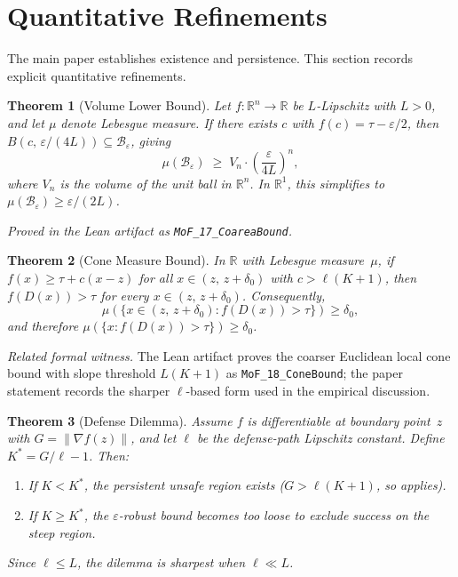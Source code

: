 \documentclass[11pt]{article}
\newtheorem{theorem}{Theorem}[section]
\newcommand{\R}{\mathbb{R}}
\begin{document}
\section{Quantitative Refinements}
\label{app:quantitative}

The main paper establishes existence and persistence. This section
records explicit quantitative refinements.

\begin{theorem}[Volume Lower Bound]
\label{thm:coarea}
Let $f\colon \R^n \to \R$ be $L$-Lipschitz with $L > 0$, and let
$\mu$ denote Lebesgue measure. If there exists $c$ with
$f(c) = \tau - \varepsilon/2$, then
$B(c,\, \varepsilon/(4L)) \subseteq
\mathcal{B}_\varepsilon$, giving
\[
  \mu(\mathcal{B}_\varepsilon)
  \;\geq\; V_n \cdot \left(\frac{\varepsilon}{4L}\right)^{\!n},
\]
where $V_n$ is the volume of the unit ball in $\R^n$. In $\R^1$,
this simplifies to $\mu(\mathcal{B}_\varepsilon) \geq \varepsilon/(2L)$.
\end{theorem}

\noindent\emph{Proved in the Lean artifact as
\textup{\texttt{MoF\_17\_CoareaBound}}.}

\begin{theorem}[Cone Measure Bound]
\label{thm:cone}
In $\R$ with Lebesgue measure~$\mu$, if
$f(x) \geq \tau + c(x - z)$ for all $x \in (z,\, z + \delta_0)$
with $c > \ell(K+1)$, then
$f(D(x)) > \tau$ for every $x \in (z,\, z + \delta_0)$. Consequently,
\[
  \mu(\{x \in (z,\, z+\delta_0) : f(D(x)) > \tau\}) \geq \delta_0,
\]
and therefore $\mu(\{x : f(D(x)) > \tau\}) \geq \delta_0$.
\end{theorem}

\noindent\emph{Related formal witness.} The Lean artifact proves the
coarser Euclidean local cone bound with slope threshold $L(K{+}1)$ as
\textup{\texttt{MoF\_18\_ConeBound}}; the paper statement records the
sharper $\ell$-based form used in the empirical discussion.

\begin{theorem}[Defense Dilemma]
\label{thm:dilemma}
Assume $f$ is differentiable at boundary point~$z$ with
$G = \|\nabla f(z)\|$, and let $\ell$ be the defense-path Lipschitz
constant. Define $K^* = G/\ell - 1$. Then:
\begin{enumerate}[nosep]
  \item If $K < K^*$, the persistent unsafe region exists
    ($G > \ell(K+1)$, so  applies).
  \item If $K \geq K^*$, the $\varepsilon$-robust bound becomes too
    loose to exclude success on the steep region.
\end{enumerate}
Since $\ell \leq L$, the dilemma is sharpest when $\ell \ll L$.
\end{theorem}
\end{document}
